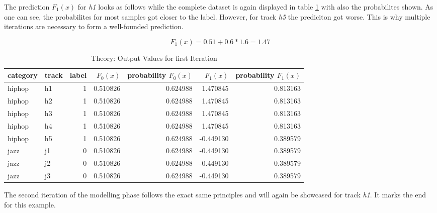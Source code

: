 The prediction \(F_{1}(x)\) for \emph{h1} looks as follows while the complete dataset is again displayed in table \ref{tbl:theory_output_values_1_iteration} with also 
the probabilites shown. As one can see, the probabilites for most samples got closer to the label. However, for track
\emph{h5} the prediciton got worse. This is why multiple iterations are necessary to form a well-founded prediction.

\begin{equation*}
F_{1}(x) = 0.51 + 0.6 * 1.6 = 1.47
\end{equation*}


\begin{table}[H]
    \centering
    \begin{tabular}{llrrrrr}
        \toprule
        category & track &  label & \(F_{0}(x)\) &  probability \(F_{0}(x)\) &  \(F_{1}(x)\) &  probability \(F_{1}(x)\) \\
        \midrule
          hiphop &    h1 &      1 & 0.510826 &         0.624988 &  1.470845 &         0.813163 \\
          hiphop &    h2 &      1 & 0.510826 &         0.624988 &  1.470845 &         0.813163 \\
          hiphop &    h3 &      1 & 0.510826 &         0.624988 &  1.470845 &         0.813163 \\
          hiphop &    h4 &      1 & 0.510826 &         0.624988 &  1.470845 &         0.813163 \\
          hiphop &    h5 &      1 & 0.510826 &         0.624988 & -0.449130 &         0.389579 \\
            jazz &    j1 &      0 & 0.510826 &         0.624988 & -0.449130 &         0.389579 \\
            jazz &    j2 &      0 & 0.510826 &         0.624988 & -0.449130 &         0.389579 \\
            jazz &    j3 &      0 & 0.510826 &         0.624988 & -0.449130 &         0.389579 \\
        \bottomrule
        \end{tabular}
    \caption{Theory: Output Values for first Iteration}%
    \label{tbl:theory_output_values_1_iteration}%
  \end{table} 

The second iteration of the modelling phase follows the exact same principles and will again be showcased for track \emph{h1}. 
It marks the end for this example. 

